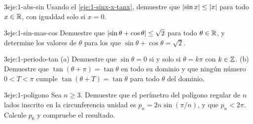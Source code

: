 \begin{ejercicio}{3}{eje:1-abs-sin}
Usando el \cref{eje:1-sinx-x-tanx}, demuestre que $\lvert\sin x\rvert\le\lvert x\rvert$ para todo $x\in\mathbb{R}$, con igualdad solo si $x=0$.
\end{ejercicio}

\begin{ejercicio}{3}{eje:1-sin-mas-cos}
Demuestre que $\lvert\sin\theta+\cos\theta\rvert\le\sqrt2$ para todo $\theta\in\mathbb{R}$, y determine los valores de $\theta$ para los que $\sin\theta+\cos\theta=\sqrt2$.
\end{ejercicio}

\begin{ejercicio}{3}{eje:1-periodo-tan}
(a) Demuestre que $\sin\theta=0$ si y solo si $\theta=k\pi$ con $k\in\mathbb{Z}$. (b) Demuestre que $\tan(\theta+\pi)=\tan\theta$ en todo su dominio y que ningún número $0<T<\pi$ cumple $\tan(\theta+T)=\tan\theta$ para todo $\theta$ del dominio.
\end{ejercicio}

\begin{ejercicio}{3}{eje:1-poligono}
Sea $n\ge 3$. Demuestre que el perímetro del polígono regular de $n$ lados inscrito en la circunferencia unidad es $p_n=2n\sin(\pi/n)$, y que $p_n<2\pi$. Calcule $p_6$ y compruebe el resultado.
\end{ejercicio}
